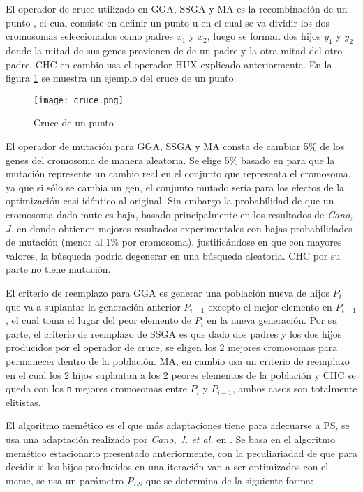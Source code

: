 El operador de cruce utilizado en GGA, SSGA y MA es la recombinación de un punto \cite{talbi2009metaheuristics}, el cual consiste en definir un punto u en el cual se va dividir los dos cromosomas seleccionados como padres $x_1$ y $x_2$, luego se forman dos hijos $y_1$ y $y_2$ donde la mitad de sus genes provienen de de un padre y la otra mitad del otro padre. CHC en cambio usa el operador HUX explicado anteriormente. En la figura \ref{cruce} se muestra un ejemplo del cruce de un punto. 

\begin{figure}[]
\centering
\texttt{[image: cruce.png]}
\caption[Cruce de un punto]{Cruce de un punto}
\label{cruce}
\end{figure}

El operador de mutación para GGA, SSGA y MA consta de cambiar 5\% de los genes del cromosoma de manera aleatoria. Se elige 5\%  basado en \cite{flores2014metaheuristics} para que la mutación represente un cambio real en el conjunto que representa el cromosoma, ya que si sólo se cambia un gen, el conjunto mutado sería para los efectos de la optimización casi idéntico al original. Sin embargo la probabilidad de que un cromosoma dado mute es baja, basado principalmente en los resultados de \emph{Cano, J.} en \cite{de2004reduccion} donde obtienen mejores resultados experimentales con bajas probabilidades de mutación (menor al 1\% por cromosoma), justificándose en que con mayores valores, la búsqueda podría degenerar en una búsqueda aleatoria. CHC por su parte no tiene mutación.

El criterio de reemplazo para GGA es generar una población nueva de hijos $P_i$ que va a suplantar la generación anterior $P_{i-1}$ excepto el mejor elemento en $P_{i-1}$, el cual toma el lugar del peor elemento de $P_i$ en la nueva generación. Por su parte, el criterio de reemplazo de SSGA es que dado dos padres y los dos hijos producidos por el operador de cruce, se eligen los 2 mejores cromosomas para permanecer dentro de la población. MA, en cambio usa un criterio de reemplazo en el cual los 2 hijos suplantan a los 2 peores elementos de la población y CHC se queda con los \texttt{n} mejores cromosomas entre $P_i$ y $P_{i-1}$, ambos casos son totalmente elitistas.

El algoritmo memético es el que más adaptaciones tiene para adecuarse a PS, se usa una adaptación realizado por \emph{Cano, J. et al.} en \cite{garcia2008memetic}. Se basa en el algoritmo memético estacionario presentado anteriormente, con la peculiariadad de que para decidir si los hijos producidos en una iteración van a ser optimizados con el meme, se usa un parámetro $P_{LS}$ que se determina de la siguiente forma:

